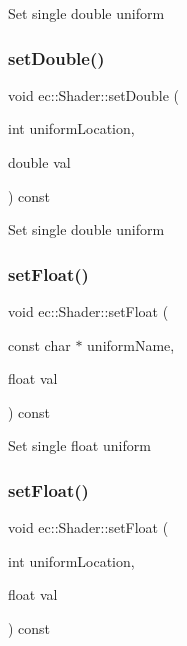 Set single double uniform \mbox{\label{classec_1_1_shader_a8261c215f7716f0b607aee6876b08f6f}} 
\subsubsection{\texorpdfstring{set\+Double()}{setDouble()}\hspace{0.1cm}{\footnotesize\ttfamily [2/2]}}
{\footnotesize\ttfamily void ec\+::\+Shader\+::set\+Double (\begin{DoxyParamCaption}\item[{int}]{uniform\+Location,  }\item[{double}]{val }\end{DoxyParamCaption}) const}

Set single double uniform \mbox{\label{classec_1_1_shader_ad260a41b380803ac03632cd9d0157e6a}} 
\subsubsection{\texorpdfstring{set\+Float()}{setFloat()}\hspace{0.1cm}{\footnotesize\ttfamily [1/2]}}
{\footnotesize\ttfamily void ec\+::\+Shader\+::set\+Float (\begin{DoxyParamCaption}\item[{const char $\ast$}]{uniform\+Name,  }\item[{float}]{val }\end{DoxyParamCaption}) const}

Set single float uniform \mbox{\label{classec_1_1_shader_a71293d86a7e138561506f7315acdb5e7}} 
\subsubsection{\texorpdfstring{set\+Float()}{setFloat()}\hspace{0.1cm}{\footnotesize\ttfamily [2/2]}}
{\footnotesize\ttfamily void ec\+::\+Shader\+::set\+Float (\begin{DoxyParamCaption}\item[{int}]{uniform\+Location,  }\item[{float}]{val }\end{DoxyParamCaption}) const}

